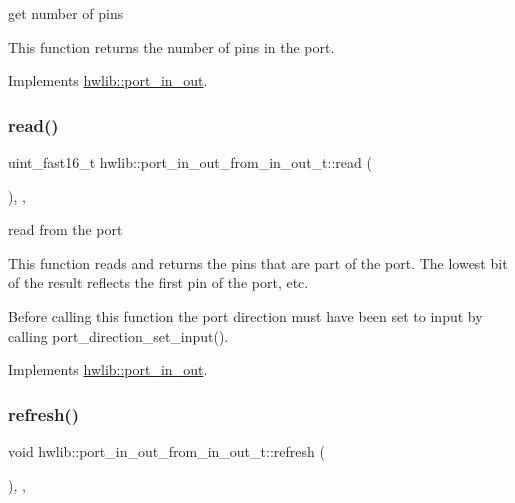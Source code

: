 get number of pins

This function returns the number of pins in the port. 

Implements \hyperlink{classhwlib_1_1port__in__out_a44243a6c7664e734563f1809058751bc}{hwlib\+::port\+\_\+in\+\_\+out}.

\mbox{\label{classhwlib_1_1port__in__out__from__in__out__t_a3ee4e60ccde68e997fa48e041dc0e74c}} 
\subsubsection{\texorpdfstring{read()}{read()}}
{\footnotesize\ttfamily uint\+\_\+fast16\+\_\+t hwlib\+::port\+\_\+in\+\_\+out\+\_\+from\+\_\+in\+\_\+out\+\_\+t\+::read (\begin{DoxyParamCaption}{ }\end{DoxyParamCaption})\hspace{0.3cm}{\ttfamily [inline]}, {\ttfamily [override]}, {\ttfamily [virtual]}}

read from the port

This function reads and returns the pins that are part of the port. The lowest bit of the result reflects the first pin of the port, etc.

Before calling this function the port direction must have been set to input by calling port\+\_\+direction\+\_\+set\+\_\+input(). 

Implements \hyperlink{classhwlib_1_1port__in__out_a5f6662d6fccd2b256d20722a4f3e5840}{hwlib\+::port\+\_\+in\+\_\+out}.

\mbox{\label{classhwlib_1_1port__in__out__from__in__out__t_a35caf2a5266975de6065d2cd801f47f3}} 
\subsubsection{\texorpdfstring{refresh()}{refresh()}}
{\footnotesize\ttfamily void hwlib\+::port\+\_\+in\+\_\+out\+\_\+from\+\_\+in\+\_\+out\+\_\+t\+::refresh (\begin{DoxyParamCaption}{ }\end{DoxyParamCaption})\hspace{0.3cm}{\ttfamily [inline]}, {\ttfamily [override]}, {\ttfamily [virtual]}}

